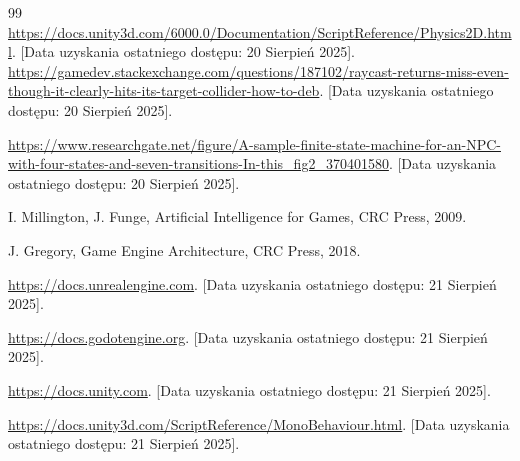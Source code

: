 \documentclass[a4paper,12pt]{book} %
\begin{document}
\begin{thebibliography}{99}
 \url{https://docs.unity3d.com/6000.0/Documentation/ScriptReference/Physics2D.html}. [Data uzyskania ostatniego dostępu: 20 Sierpień 2025].
 \url{https://gamedev.stackexchange.com/questions/187102/raycast-returns-miss-even-though-it-clearly-hits-its-target-collider-how-to-deb}. [Data uzyskania ostatniego dostępu: 20 Sierpień 2025].

 \url{https://www.researchgate.net/figure/A-sample-finite-state-machine-for-an-NPC-with-four-states-and-seven-transitions-In-this_fig2_370401580}. [Data uzyskania ostatniego dostępu: 20 Sierpień 2025].

 I. Millington, J. Funge, Artificial Intelligence for Games, CRC Press, 2009.

 J. Gregory, Game Engine Architecture, CRC Press, 2018.

 \url{https://docs.unrealengine.com}. [Data uzyskania ostatniego dostępu: 21 Sierpień 2025].

 \url{https://docs.godotengine.org}. [Data uzyskania ostatniego dostępu: 21 Sierpień 2025].

 \url{https://docs.unity.com}. [Data uzyskania ostatniego dostępu: 21 Sierpień 2025].

 \url {https://docs.unity3d.com/ScriptReference/MonoBehaviour.html}. [Data uzyskania ostatniego dostępu: 21 Sierpień 2025].


\end{thebibliography}
\end{document}
